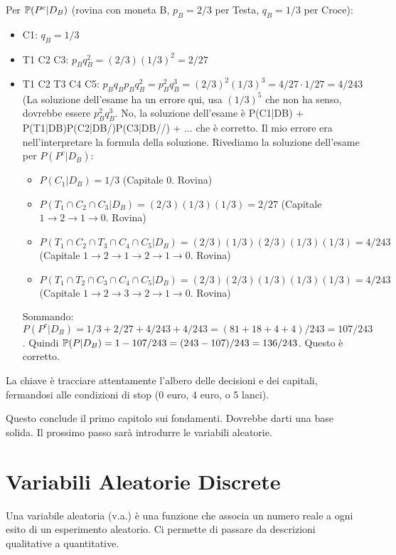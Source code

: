 \documentclass[12pt,a4paper]{article}
\begin{document}
\begin{example}
Per $\mathbb{P}(P^c|D_B)$ (rovina con moneta B, $p_B=2/3$ per Testa, $q_B=1/3$ per Croce):
\begin{itemize}
    \item C1: $q_B = 1/3$
    \item T1 C2 C3: $p_B q_B^2 = (2/3)(1/3)^2 = 2/27$
    \item T1 C2 T3 C4 C5: $p_B q_B p_B q_B^2 = p_B^2 q_B^3 = (2/3)^2 (1/3)^3 = 4/27 \cdot 1/27 = 4/243$ (La soluzione dell'esame ha un errore qui, usa $(1/3)^5$ che non ha senso, dovrebbe essere $p_B^2 q_B^3$. No, la soluzione dell'esame è P(C1|DB) + P(T1|DB)P(C2|DB/)P(C3|DB//) + ... che è corretto. Il mio errore era nell'interpretare la formula della soluzione.
    Rivediamo la soluzione dell'esame per $P(P^c|D_B)$:
    \begin{itemize}
        \item $P(C_1|D_B) = 1/3$ (Capitale 0. Rovina)
        \item $P(T_1 \cap C_2 \cap C_3 | D_B) = (2/3)(1/3)(1/3) = 2/27$ (Capitale $1 \to 2 \to 1 \to 0$. Rovina)
        \item $P(T_1 \cap C_2 \cap T_3 \cap C_4 \cap C_5 | D_B) = (2/3)(1/3)(2/3)(1/3)(1/3) = 4/243$ (Capitale $1 \to 2 \to 1 \to 2 \to 1 \to 0$. Rovina)
        \item $P(T_1 \cap T_2 \cap C_3 \cap C_4 \cap C_5 | D_B) = (2/3)(2/3)(1/3)(1/3)(1/3) = 4/243$ (Capitale $1 \to 2 \to 3 \to 2 \to 1 \to 0$. Rovina)
    \end{itemize}
    Sommando: $P(P^c|D_B) = 1/3 + 2/27 + 4/243 + 4/243 = (81+18+4+4)/243 = 107/243$.
    Quindi $\mathbb{P}(P|D_B) = 1 - 107/243 = (243-107)/243 = 136/243$. Questo è corretto.
\end{itemize}
La chiave è tracciare attentamente l'albero delle decisioni e dei capitali, fermandosi alle condizioni di stop (0 euro, 4 euro, o 5 lanci).

Questo conclude il primo capitolo sui fondamenti. Dovrebbe darti una base solida. Il prossimo passo sarà introdurre le variabili aleatorie.


\chapter{Variabili Aleatorie Discrete}
\label{cap:va_discrete}
Una variabile aleatoria (v.a.) è una funzione che associa un numero reale a ogni esito di un esperimento aleatorio. Ci permette di passare da descrizioni qualitative a quantitative.


\end{example}
\end{document}
